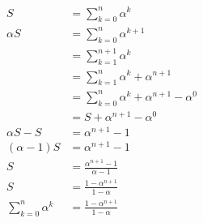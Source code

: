 \documentclass{article}
\begin{document}
\[\begin{aligned}
S &= \sum_{k=0}^n \alpha^k \\
\alpha S &= \sum_{k=0}^n \alpha^{k+1}\\
    &= \sum_{k=1}^{n+1} \alpha^k\\
    &= \sum_{k=1}^{n}\alpha^k + \alpha^{n+1}\\
    &= \sum_{k=0}^{n}\alpha^k + \alpha^{n+1} - \alpha^0\\
    &= S + \alpha^{n+1} - \alpha^0 \\
\alpha S - S &= \alpha^{n+1} - 1 \\
\left(\alpha - 1\right)S &= \alpha^{n+1} - 1 \\
S &= \frac{\alpha^{n+1} - 1}{\alpha - 1} \\
S &= \frac{1 - \alpha^{n+1}}{1 - \alpha} \\
\sum_{k=0}^n \alpha^k &= \frac{1 - \alpha^{n+1}}{1 - \alpha} \\
\end{aligned}\]
\end{document}
